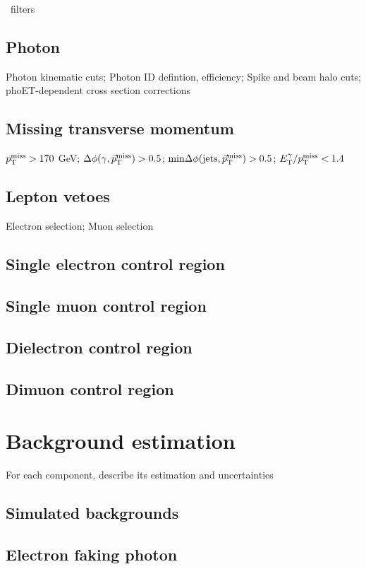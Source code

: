 \documentclass[oneside, letterpaper, 12pt, oldfontcommands]{memoir}
\begin{document}
\MET\ filters
\section{Photon} \label{sec:event_selection_photon}
Photon kinematic cuts; Photon ID defintion, efficiency; Spike and beam halo cuts; phoET-dependent cross section corrections
\section{Missing transverse momentum} \label{sec:event_selection_MET}
$p_\mathrm{T}^\mathrm{miss} > 170$ GeV; $\Delta\phi(\gamma,\vec{p}_\mathrm{T}^\mathrm{miss}) > 0.5$; $\mathrm{min}\Delta\phi(\mathrm{jets},\vec{p}_\mathrm{T}^\mathrm{miss}) > 0.5$;
$E_\mathrm{T}^{\gamma}/p_\mathrm{T}^\mathrm{miss} < 1.4$
\section{Lepton vetoes} \label{sec:event_selection_lepveto}
Electron selection; Muon selection
\section{Single electron control region} \label{sec:event_selection_monoele}
\section{Single muon control region} \label{sec:event_selection_monomu}
\section{Dielectron control region} \label{sec:event_selection_diele}
\section{Dimuon control region} \label{sec:event_selection_dimu}

\chapter{Background estimation} \label{chap:background_estimation}
For each component, describe its estimation and uncertainties
\section{Simulated backgrounds} \label{sec:background_estimation_simulated}
\section{Electron faking photon} \label{sec:background_estimation_elefake}
\end{document}
